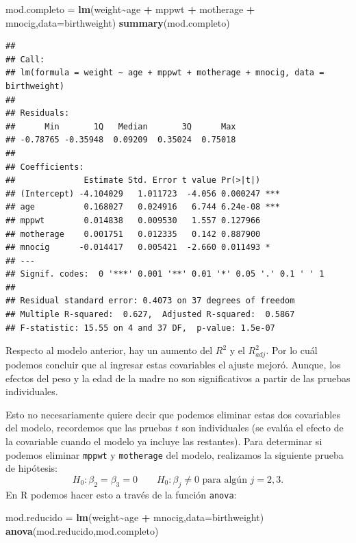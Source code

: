 \documentclass[
]{article}
\newenvironment{Shaded}{\begin{snugshade}}{\end{snugshade}}
\newcommand{\AttributeTok}[1]{\textcolor[rgb]{0.13,0.29,0.53}{#1}}
\newcommand{\FunctionTok}[1]{\textcolor[rgb]{0.13,0.29,0.53}{\textbf{#1}}}
\newcommand{\NormalTok}[1]{#1}
\newcommand{\OtherTok}[1]{\textcolor[rgb]{0.56,0.35,0.01}{#1}}
\newcommand{\SpecialCharTok}[1]{\textcolor[rgb]{0.81,0.36,0.00}{\textbf{#1}}}
\begin{document}
\begin{Shaded}
\begin{Highlighting}[]
\NormalTok{mod.completo }\OtherTok{=} \FunctionTok{lm}\NormalTok{(weight}\SpecialCharTok{\textasciitilde{}}\NormalTok{age }\SpecialCharTok{+}\NormalTok{ mppwt }\SpecialCharTok{+}\NormalTok{ motherage }\SpecialCharTok{+}\NormalTok{ mnocig,}\AttributeTok{data=}\NormalTok{birthweight)}
\FunctionTok{summary}\NormalTok{(mod.completo)}
\end{Highlighting}
\end{Shaded}

\begin{verbatim}
## 
## Call:
## lm(formula = weight ~ age + mppwt + motherage + mnocig, data = birthweight)
## 
## Residuals:
##      Min       1Q   Median       3Q      Max 
## -0.78765 -0.35948  0.09209  0.35024  0.75018 
## 
## Coefficients:
##              Estimate Std. Error t value Pr(>|t|)    
## (Intercept) -4.104029   1.011723  -4.056 0.000247 ***
## age          0.168027   0.024916   6.744 6.24e-08 ***
## mppwt        0.014838   0.009530   1.557 0.127966    
## motherage    0.001751   0.012335   0.142 0.887900    
## mnocig      -0.014417   0.005421  -2.660 0.011493 *  
## ---
## Signif. codes:  0 '***' 0.001 '**' 0.01 '*' 0.05 '.' 0.1 ' ' 1
## 
## Residual standard error: 0.4073 on 37 degrees of freedom
## Multiple R-squared:  0.627,  Adjusted R-squared:  0.5867 
## F-statistic: 15.55 on 4 and 37 DF,  p-value: 1.5e-07
\end{verbatim}

Respecto al modelo anterior, hay un aumento del \(R^{2}\) y el \(R^{2}_{adj}\). Por lo cuál podemos concluir que al ingresar estas covariables el ajuste mejoró. Aunque, los efectos del peso y la edad de la madre no son significativos a partir de las pruebas individuales.

Esto no necesariamente quiere decir que podemos eliminar estas dos covariables del modelo, recordemos que las pruebas \(t\) son individuales (se evalúa el efecto de la covariable cuando el modelo ya incluye las restantes). Para determinar si podemos eliminar \texttt{mppwt} y \texttt{motherage} del modelo, realizamos la siguiente prueba de hipótesis:
\[
H_{0}: \beta_{2} = \beta_{3} = 0 \qquad H_{0}: \beta_{j} \neq 0 \mbox{ para algún }j=2,3.
\]
En R podemos hacer esto a través de la función \texttt{anova}:

\begin{Shaded}
\begin{Highlighting}[]
\NormalTok{mod.reducido }\OtherTok{=} \FunctionTok{lm}\NormalTok{(weight}\SpecialCharTok{\textasciitilde{}}\NormalTok{age }\SpecialCharTok{+}\NormalTok{ mnocig,}\AttributeTok{data=}\NormalTok{birthweight)}
\FunctionTok{anova}\NormalTok{(mod.reducido,mod.completo)}
\end{Highlighting}
\end{Shaded}
\end{document}
